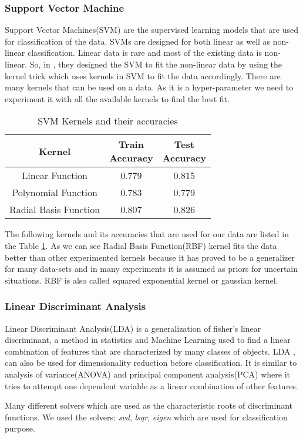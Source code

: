 \documentclass[conference]{IEEEtran}
\begin{document}
\subsubsection*{Support Vector Machine}
Support Vector Machines(SVM) are the supervised learning models that are used for classification of the data. SVMs are designed for both linear as well as non-linear classification. Linear data is rare and most of the existing data is non-linear. So, in \cite{svm}, they designed the SVM to fit the non-linear data by using the kernel trick which uses kernels in SVM to fit the data accordingly. There are many kernels that can be used on a data. As it is a hyper-parameter we need to experiment it with all the available kernels to find the best fit.
\begin{table}[ht]
\centering
 \begin{tabular}{|c| c c|} 
 \hline
 Kernel  & \thead{Train \\ Accuracy} & \thead{Test \\ Accuracy} \\ [0.5ex] 
 \hline
 Linear Function & 0.779 & 0.815\\ 

 Polynomial Function & 0.783 & 0.779\\
 
 Radial Basis Function & 0.807 & 0.826\\
 \hline
\end{tabular}
\vspace*{0.25cm}
\caption{SVM Kernels and their accuracies}
\label{table:svm}
\end{table}
\par
The following kernels and its accuracies that are used for our data are listed in the Table \ref{table:svm}. As we can see Radial Basis Function(RBF) kernel fits the data better than other experimented kernels because it has proved to be a generalizer for many data-sets and in many experiments it is assumed as priors for uncertain situations. RBF is also called squared exponential kernel or gaussian kernel.            

\subsubsection*{Linear Discriminant Analysis}
Linear Discriminant Analysis(LDA) is a generalization of fisher's linear discriminant, a method in statistics and Machine Learning used to find a linear combination of features that are characterized by many classes of objects. LDA \cite{lda}, can also be used for dimensionality reduction before classification. It is similar to analysis of variance(ANOVA) and principal component analysis(PCA) where it tries to attempt one dependent variable as a linear combination of other features.
\par
Many different solvers which are used as the characteristic roots of discriminant functions. We used the solvers: \textit{svd},  \textit{lsqr}, \textit{eigen} which are used for classification purpose.
\end{document}
